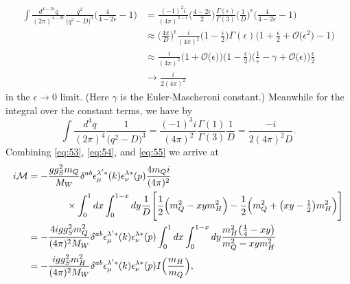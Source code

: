 \begin{equation}
  \label{eq:54}
  \begin{aligned}
    \int\frac{d^{4-2\epsilon}q}{(2\pi)^{4-2\epsilon}}
        \frac{q^2}{\big(q^2-D\big)^3}\Bigg(\frac{4}{4-2\epsilon}-1\Bigg)
     &=\frac{(-1)^2i}{(4\pi)^{2-\epsilon}}\Bigg(\frac{4-2\epsilon}{2}\Bigg)
        \frac{\Gamma(\epsilon)}{\Gamma(3)}\Bigg(\frac{1}{D}\Bigg)^\epsilon
        \Bigg(\frac{4}{4-2\epsilon}-1\Bigg) \\
     &\approx\Bigg(\frac{4\pi}{D}\Bigg)^\epsilon\frac{i}{(4\pi)^2}
        \Bigg(1-\frac{\epsilon}{2}\Bigg)\Gamma(\epsilon)
        \Bigg(1+\frac{\epsilon}{2}+\mathcal{O}\big(\epsilon^2\big)-1\Bigg) \\
     &\approx\frac{i}{(4\pi)^2}\Big(1+\mathcal{O}\big(\epsilon\big)\Big)
        \Bigg(1-\frac{\epsilon}{2}\Bigg)\Bigg(\frac{1}{\epsilon}-\gamma
        +\mathcal{O}\big(\epsilon\big)\Bigg)\frac{\epsilon}{2} \\
     &\to\frac{i}{2(4\pi)^2}
  \end{aligned}
\end{equation}
in the $\epsilon\to 0$ limit. (Here $\gamma$ is the Euler-Mascheroni constant.)
Meanwhile for the integral over the constant terms, we have by
\cite[A.44]{peskin_introduction_1995}
\begin{equation}
  \label{eq:55}
  \int\frac{d^4q}{(2\pi)^4}\frac{1}{\big(q^2-D\big)^3}
      =\frac{(-1)^3i}{(4\pi)^2}\frac{\Gamma(1)}{\Gamma(3)}\frac{1}{D}
      =\frac{-i}{2(4\pi)^2D}.
\end{equation}
Combining \eqref{eq:53}, \eqref{eq:54}, and \eqref{eq:55} we arrive at
\begin{equation}
  \label{eq:56}
  \begin{aligned}
    i\mathcal{M}&=-\frac{gg_S^2m_Q}{M_W}\delta^{ab}\epsilon^{\lambda'*}_\mu(k)
             \epsilon^{\lambda*}_\nu(p)\frac{4m_Qi}{(4\pi)^2} \\
        &~~~~~~~~~~~~\times\int_0^1dx\int_0^{1-x}dy\frac{1}{D}
             \Bigg[\frac{1}{2}\Big(m_Q^2-xym_H^2\Big)
              -\frac{1}{2}\Big(m_Q^2+\big(xy-\tfrac{1}{2}\big)m_H^2\Big)\Bigg]
             \\
        &=-\frac{4igg_S^2m_Q^2}{(4\pi)^2M_W}\delta^{ab}
               \epsilon^{\lambda'*}_\mu(k)\epsilon^{\lambda*}_\nu(p)
               \int_0^1dx\int_0^{1-x}dy
               \frac{m_H^2\big(\tfrac{1}{4}-xy\big)}{m_Q^2-xym_H^2} \\
        &=-\frac{igg_S^2m_H^2}{(4\pi)^2M_W}\delta^{ab}
               \epsilon^{\lambda'*}_\mu(k)\epsilon^{\lambda*}_\nu(p)
               I\Big(\frac{m_H}{m_Q}\Big),  
  \end{aligned}
\end{equation}
